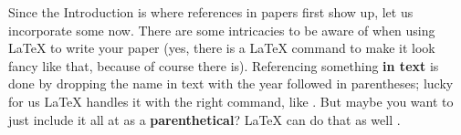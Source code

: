\documentclass[doc,12pt,floatsintext]{apa7}
\begin{document}
Since the Introduction is where references in papers first show up, let us incorporate some now. There are some intricacies to be aware of when using \LaTeX{} to write your paper (yes, there is a \LaTeX{} command to make it look fancy like that, because of course there is). Referencing something \textbf{in text} is done by dropping the name in text with the year followed in parentheses; lucky for us \LaTeX{} handles it with the right command, like  \textcite{wilensky_introduction_2015}. But maybe you want to just include it all at as a \textbf{parenthetical}? \LaTeX{} can do that as well \parencite{steinbruner_climate_2013}. %
% 
% 
% 
% 
\end{document}
